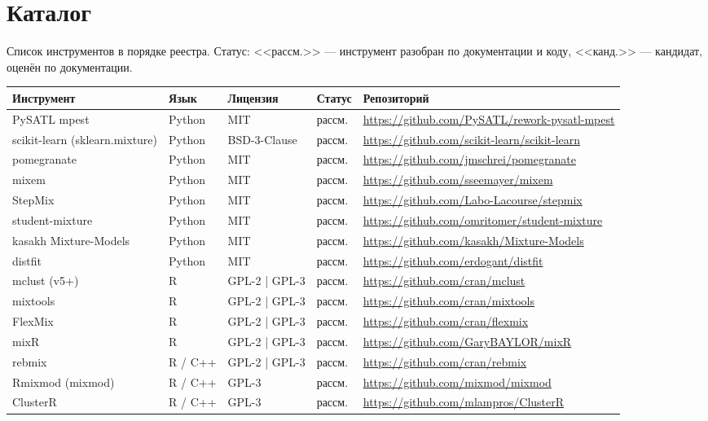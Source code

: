 \documentclass[10pt,a4paper]{article}
\begin{document}
\section{Каталог}
Список инструментов в порядке реестра. Статус: <<рассм.>> --- инструмент разобран по документации и коду, <<канд.>> --- кандидат, оценён по документации.
{\footnotesize
\begin{longtable}{@{}>{\raggedright\arraybackslash}p{4.2cm} >{\raggedright\arraybackslash}p{1.8cm} >{\raggedright\arraybackslash}p{2.3cm} l >{\raggedright\arraybackslash}p{6.2cm}@{}}
\toprule
Инструмент & Язык & Лицензия & Статус & Репозиторий \\
\midrule
\endhead
PySATL mpest & Python & MIT & рассм. & \url{https://github.com/PySATL/rework-pysatl-mpest} \\
scikit-learn (sklearn.mixture) & Python & BSD-3-Clause & рассм. & \url{https://github.com/scikit-learn/scikit-learn} \\
pomegranate & Python & MIT & рассм. & \url{https://github.com/jmschrei/pomegranate} \\
mixem & Python & MIT & рассм. & \url{https://github.com/sseemayer/mixem} \\
StepMix & Python & MIT & рассм. & \url{https://github.com/Labo-Lacourse/stepmix} \\
student-mixture & Python & MIT & рассм. & \url{https://github.com/omritomer/student-mixture} \\
kasakh Mixture-Models & Python & MIT & рассм. & \url{https://github.com/kasakh/Mixture-Models} \\
distfit & Python & MIT & рассм. & \url{https://github.com/erdogant/distfit} \\
mclust (v5+) & R & GPL-2 | GPL-3 & рассм. & \url{https://github.com/cran/mclust} \\
mixtools & R & GPL-2 | GPL-3 & рассм. & \url{https://github.com/cran/mixtools} \\
FlexMix & R & GPL-2 | GPL-3 & рассм. & \url{https://github.com/cran/flexmix} \\
mixR & R & GPL-2 | GPL-3 & рассм. & \url{https://github.com/GaryBAYLOR/mixR} \\
rebmix & R / C++ & GPL-2 | GPL-3 & рассм. & \url{https://github.com/cran/rebmix} \\
Rmixmod (mixmod) & R / C++ & GPL-3 & рассм. & \url{https://github.com/mixmod/mixmod} \\
ClusterR & R / C++ & GPL-3 & рассм. & \url{https://github.com/mlampros/ClusterR} \\

\end{longtable}}
\end{document}
